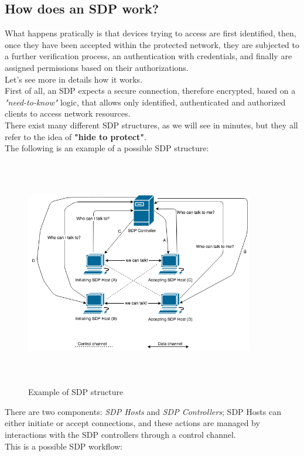\documentclass[12pt]{report}
\begin{document}
{\subsection{How does an SDP work?}
\bigskip

What happens pratically is that devices trying to access are first identified, then, once they have been accepted within the protected network, they are subjected to a further verification process, an authentication with credentials, and finally are assigned permissions based on their authorizations.\\
Let's see more in details how it works.\\

First of all, an SDP expects a secure connection, therefore encrypted, based on a \textit{"need-to-know"} logic, that allows only identified, authenticated and authorized clients to access network resources.\\
There exist many different SDP structures, as we will see in minutes, but they all refer to the idea of \textbf{"hide to protect"}.\\

The following is an example of a possible SDP structure:

\begin{figure}[H]
\includegraphics[width=10cm,height=10cm,keepaspectratio]{sdp_structure}
\centering
\caption{Example of  SDP structure}
\end{figure}

There are two components: \textit{SDP Hosts} and \textit{SDP Controllers}; SDP Hosts can either initiate or accept connections, and these actions are managed by interactions with the SDP controllers through a control channel.\\
This is a possible SDP workflow:

}
\end{document}
